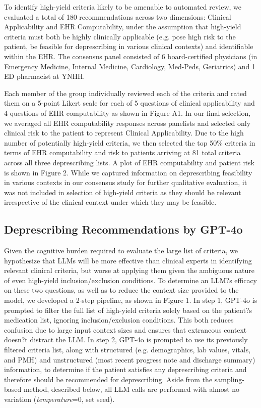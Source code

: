To identify high-yield criteria likely to be amenable to automated review, we evaluated a total of 180 recommendations across two dimensions: Clinical Applicability and EHR Computability, under the assumption that high-yield criteria must both be highly clinically applicable (e.g. pose high risk to the patient, be feasible for deprescribing in various clinical contexts) and identifiable within the EHR. The consensus panel consisted of 6 board-certified physicians (in Emergency Medicine, Internal Medicine, Cardiology, Med-Peds, Geriatrics) and 1 ED pharmacist at YNHH. 

Each member of the group individually reviewed each of the criteria and rated them on a 5-point Likert scale for each of 5 questions of clinical applicability and 4 questions of EHR computability as shown in Figure A1. In our final selection, we averaged all EHR computability responses across panelists and selected only clinical risk to the patient to represent Clinical Applicability. Due to the high number of potentially high-yield criteria, we then selected the top 50\% criteria in terms of EHR computability and risk to patients arriving at 81 total criteria across all three deprescribing lists. A plot of EHR computability and patient risk is shown in Figure 2. While we captured information on deprescribing feasibility in various contexts in our consensus study for further qualitative evaluation, it was not included in selection of high-yield criteria as they should be relevant irrespective of the clinical context under which they may be feasible. 


\subsection{Deprescribing Recommendations by GPT-4o}

Given the cognitive burden required to evaluate the large list of criteria, we hypothesize that LLMs will be more effective than clinical experts in identifying relevant clinical criteria, but worse at applying them given the ambiguous nature of even high-yield inclusion/exclusion conditions. To determine an LLM?s efficacy on these two questions, as well as to reduce the context size provided to the model, we developed a 2-step pipeline, as shown in Figure 1. In step 1, GPT-4o is prompted to filter the full list of high-yield criteria solely based on the patient?s medication list, ignoring inclusion/exclusion conditions. This both reduces confusion due to large input context sizes and ensures that extraneous context doesn?t distract the LLM. In step 2, GPT-4o is prompted to use its previously filtered criteria list, along with structured (e.g. demographics, lab values, vitals, and PMH) and unstructured (most recent progress note and discharge summary) information, to determine if the patient satisfies any deprescribing criteria and therefore should be recommended for deprescribing. Aside from the sampling-based method, described below, all LLM calls are performed with almost no variation (\emph{temperature}=0, set seed). 

